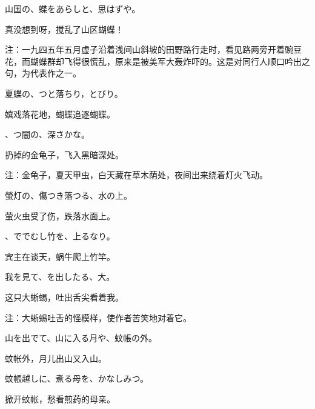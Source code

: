 \begin{haiku}
    {\FH 山国の、蝶をあらしと、思はずや。}

    {\FK 真没想到呀，搅乱了山区蝴蝶！}

    {\FT 注：一九四五年五月虚子沿着浅间山斜坡的田野路行走时，看见路两旁开着豌豆花，而蝴蝶群却飞得很慌乱，原来是被美军大轰炸吓的。这是对同行人顺口吟出之句，为代表作之一。}
\end{haiku}

\begin{haiku}
    {\FH 夏蝶の、つと落ちり，とびり。}

    {\FK 嬉戏落花地，蝴蝶追逐蝴蝶。}
\end{haiku}

\begin{haiku}
    {\FH {}、つ闇の、深さかな。}

    {\FK 扔掉的金龟子，飞入黑暗深处。}

    {\FT 注：金龟子，夏天甲虫，白天藏在草木荫处，夜间出来绕着灯火飞动。}
\end{haiku}

\begin{haiku}
    {\FH 螢灯の、傷つき落つる、水の上。}

    {\FK 萤火虫受了伤，跌落水面上。}
\end{haiku}

\begin{haiku}
    {\FH {}、ででむし竹を、上るなり。}

    {\FK 宾主在谈天，蜗牛爬上竹竿。}
\end{haiku}

\begin{haiku}
    {\FH 我を見て、を出したる、大。}

    {\FK 这只大蜥蜴，吐出舌尖看着我。}

    {\FT 注：大蜥蜴吐舌的怪模样，使作者苦笑地对着它。}
\end{haiku}

\begin{haiku}
    {\FH 山を出でて、山に入る月や、蚊帳の外。}

    {\FK 蚊帐外，月儿出山又入山。}
\end{haiku}

\begin{haiku}
    {\FH 蚊帳越しに、煮る母を、かなしみつ。}

    {\FK 掀开蚊帐，愁看煎药的母亲。}
\end{haiku}

